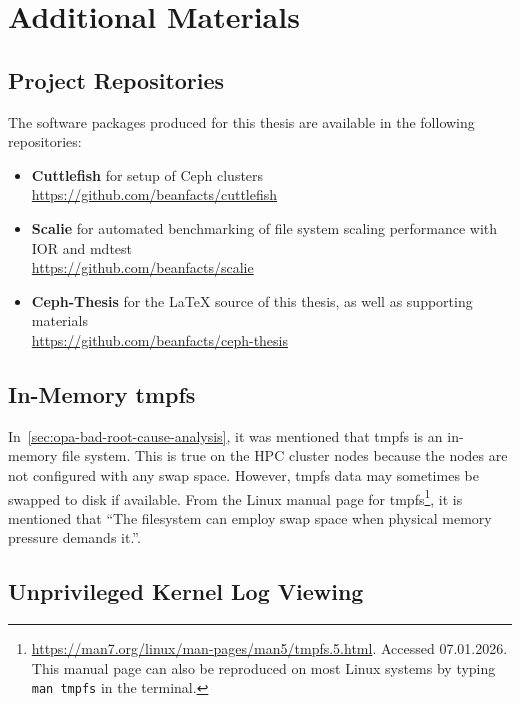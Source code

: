 \section{Additional Materials}

\subsection{Project Repositories}
\label{appendix:project-repositories}

The software packages produced for this thesis are available in the following repositories:

\begin{itemize}
    \item \textbf{Cuttlefish} for setup of Ceph clusters\\ \url{https://github.com/beanfacts/cuttlefish}
    \item \textbf{Scalie} for automated benchmarking of file system scaling performance with \acs{IOR} and mdtest\\ \url{https://github.com/beanfacts/scalie}
    \item \textbf{Ceph-Thesis} for the LaTeX source of this thesis, as well as supporting materials\\ \url{https://github.com/beanfacts/ceph-thesis}
\end{itemize}

\subsection{In-Memory tmpfs}
\label{appendix:tmpfs-in-memory}

In~\cref{sec:opa-bad-root-cause-analysis}, it was mentioned that tmpfs is an in-memory file system. This is true on the \ac{HPC} cluster nodes because the nodes are not configured with any swap space. However, tmpfs data may sometimes be swapped to disk if available. From the Linux manual page for tmpfs\footnote{\url{https://man7.org/linux/man-pages/man5/tmpfs.5.html}. Accessed 07.01.2026. This manual page can also be reproduced on most Linux systems by typing \texttt{man tmpfs} in the terminal.}, it is mentioned that \enquote{The filesystem can employ swap space when physical memory pressure demands it.}.

\subsection{Unprivileged Kernel Log Viewing}
\label{appendix:dmesg-unprivileged}


